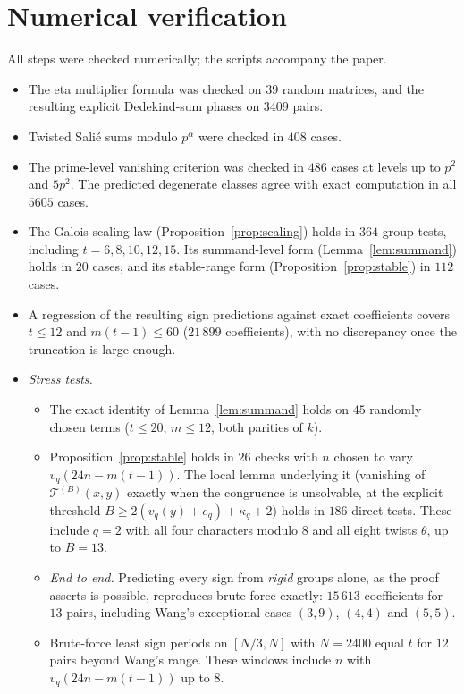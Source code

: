 \documentclass[11pt]{amsart}
\theoremstyle{definition}\newtheorem{definition}[theorem]{Definition}
\theoremstyle{remark}\newtheorem{remark}[theorem]{Remark}
\begin{document}
\section{Numerical verification}\label{sec:num}
All steps were checked numerically; the scripts accompany the paper.
\begin{itemize}[leftmargin=1.5em]
\item The eta multiplier formula was checked on $39$ random matrices, and the resulting explicit Dedekind-sum phases on $3409$ pairs.
\item Twisted Sali\'e sums modulo $p^\alpha$ were checked in $408$ cases.
\item The prime-level vanishing criterion was checked in $486$ cases at levels up to $p^2$ and $5p^2$. The predicted degenerate classes agree with exact computation in all $5605$ cases.
\item The Galois scaling law (Proposition~\ref{prop:scaling}) holds in $364$ group tests, including $t=6,8,10,12,15$. Its summand-level form (Lemma~\ref{lem:summand}) holds in $20$ cases, and its stable-range form (Proposition~\ref{prop:stable}) in $112$ cases.
\item A regression of the resulting sign predictions against exact coefficients covers $t\le12$ and $m(t-1)\le60$ ($21\,899$ coefficients), with no discrepancy once the truncation is large enough.
\item \emph{Stress tests.}
\begin{itemize}[leftmargin=1.5em]
\item The exact identity of Lemma~\ref{lem:summand} holds on $45$ randomly chosen terms ($t\le20$, $m\le12$, both parities of $k$).
\item Proposition~\ref{prop:stable} holds in $26$ checks with $n$ chosen to vary $v_q(24n-m(t-1))$. The local lemma underlying it (vanishing of $\mathcal T^{(B)}(x,y)$ exactly when the congruence is unsolvable, at the explicit threshold $B\ge2(v_q(y)+e_q)+\kappa_q+2$) holds in $186$ direct tests. These include $q=2$ with all four characters modulo $8$ and all eight twists $\theta$, up to $B=13$.
\item \emph{End to end.} Predicting every sign from \emph{rigid} groups alone, as the proof asserts is possible, reproduces brute force exactly: $15\,613$ coefficients for $13$ pairs, including Wang's exceptional cases $(3,9)$, $(4,4)$ and $(5,5)$.
\item Brute-force least sign periods on $[N/3,N]$ with $N=2400$ equal $t$ for $12$ pairs beyond Wang's range. These windows include $n$ with $v_q(24n-m(t-1))$ up to $8$.

\end{itemize}
\end{itemize}
\end{document}
